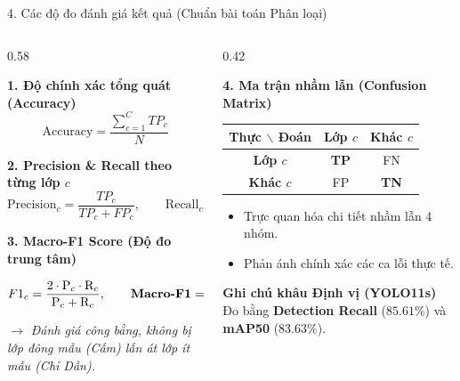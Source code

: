 \documentclass[aspectratio=169, 10pt]{beamer}
\begin{document}
\begin{frame}{4. Các độ đo đánh giá kết quả (Chuẩn bài toán Phân loại)}
  \begin{columns}[T]
    \begin{column}{0.58\textwidth}
      \begin{block}{\textbf{1. Độ chính xác tổng quát (Accuracy)}}
        $$\text{Accuracy} = \frac{\sum_{c=1}^{C} TP_c}{N}$$
      \end{block}

      \begin{block}{\textbf{2. Precision \& Recall theo từng lớp $c$}}
        $$\text{Precision}_c = \frac{TP_c}{TP_c + FP_c}, \qquad \text{Recall}_c = \frac{TP_c}{TP_c + FN_c}$$
      \end{block}

      \begin{exampleblock}{\textbf{3. Macro-F1 Score (Độ đo trung tâm)}}
        $$F1_c = \frac{2 \cdot \text{P}_c \cdot \text{R}_c}{\text{P}_c + \text{R}_c}, \qquad \text{\textbf{Macro-F1}} = \frac{1}{C} \sum_{c=1}^{C} F1_c$$
        \textit{\scriptsize $\rightarrow$ Đánh giá công bằng, không bị lớp đông mẫu (Cấm) lấn át lớp ít mẫu (Chỉ Dẫn).}
      \end{exampleblock}
    \end{column}

    \begin{column}{0.42\textwidth}
      \begin{block}{\textbf{4. Ma trận nhầm lẫn (Confusion Matrix)}}
        \centering
        \footnotesize
        \begin{tabular}{|c|c|c|}
          \hline
          \textbf{Thực $\backslash$ Đoán} & \textbf{Lớp $c$} & \textbf{Khác $c$} \\
          \hline
          \textbf{Lớp $c$} & \cellcolor{green!20}\textbf{TP} & \cellcolor{red!20}FN \\
          \hline
          \textbf{Khác $c$} & \cellcolor{red!20}FP & \cellcolor{green!20}\textbf{TN} \\
          \hline
        \end{tabular}
        \vspace{0.1cm}
        \scriptsize
        \begin{itemize}\setlength{\itemsep}{1pt}
          \item Trực quan hóa chi tiết nhầm lẫn 4 nhóm.
          \item Phản ánh chính xác các ca lỗi thực tế.
        \end{itemize}
      \end{block}
      \vspace{0.05cm}
      \begin{alertblock}{\scriptsize \textbf{Ghi chú khâu Định vị (YOLO11s)}}
        \scriptsize Đo bằng \textbf{Detection Recall} ($85.61\%$) và \textbf{mAP50} ($83.63\%$).
      \end{alertblock}
    \end{column}
  \end{columns}
\end{frame}
\end{document}
